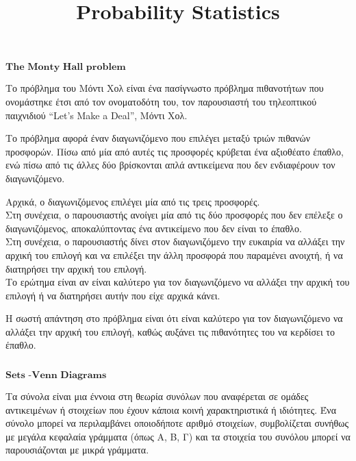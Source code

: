 \documentclass[11pt]{article}
\title{Probability Statistics}
\makeatletter
\newcommand{\boxspacing}{\kern\kvtcb@left@rule\kern\kvtcb@boxsep}
\newcommand{\prompt}[4]{
        {\ttfamily\llap{{\color{#2}[#3]:\hspace{3pt}#4}}\vspace{-\baselineskip}}
    }
\makeatother
\begin{document}
    
    \maketitle
    
    

    
    \(\textbf{The Monty Hall problem}\)

    Το πρόβλημα του Μόντι Χολ είναι ένα πασίγνωστο πρόβλημα πιθανοτήτων που
ονομάστηκε έτσι από τον ονοματοδότη του, τον παρουσιαστή του τηλεοπτικού
παιχνιδιού ``Let's Make a Deal'', Μόντι Χολ.

Το πρόβλημα αφορά έναν διαγωνιζόμενο που επιλέγει μεταξύ τριών πιθανών
προσφορών. Πίσω από μία από αυτές τις προσφορές κρύβεται ένα αξιοθέατο
έπαθλο, ενώ πίσω από τις άλλες δύο βρίσκονται απλά αντικείμενα που δεν
ενδιαφέρουν τον διαγωνιζόμενο.

Αρχικά, ο διαγωνιζόμενος επιλέγει μία από τις τρεις προσφορές.\\
Στη συνέχεια, ο παρουσιαστής ανοίγει μία από τις δύο προσφορές που δεν
επέλεξε ο διαγωνιζόμενος, αποκαλύπτοντας ένα αντικείμενο που δεν είναι
το έπαθλο.\\
Στη συνέχεια, ο παρουσιαστής δίνει στον διαγωνιζόμενο την ευκαιρία να
αλλάξει την αρχική του επιλογή και να επιλέξει την άλλη προσφορά που
παραμένει ανοιχτή, ή να διατηρήσει την αρχική του επιλογή.\\
Το ερώτημα είναι αν είναι καλύτερο για τον διαγωνιζόμενο να αλλάξει την
αρχική του επιλογή ή να διατηρήσει αυτήν που είχε αρχικά κάνει.

Η σωστή απάντηση στο πρόβλημα είναι ότι είναι καλύτερο για τον
διαγωνιζόμενο να αλλάξει την αρχική του επιλογή, καθώς αυξάνει τις
πιθανότητες του να κερδίσει το έπαθλο.

    \begin{tcolorbox}[breakable, size=fbox, boxrule=1pt, pad at break*=1mm,colback=cellbackground, colframe=cellborder]
\prompt{In}{incolor}{ }{\boxspacing}
\begin{Verbatim}[commandchars=\\\{\}]

\end{Verbatim}
\end{tcolorbox}

    \(\textbf{Sets -Venn Diagrams}\)

    Τα σύνολα είναι μια έννοια στη θεωρία συνόλων που αναφέρεται σε ομάδες
αντικειμένων ή στοιχείων που έχουν κάποια κοινή χαρακτηριστικά ή
ιδιότητες. Ένα σύνολο μπορεί να περιλαμβάνει οποιοδήποτε αριθμό
στοιχείων, συμβολίζεται συνήθως με μεγάλα κεφαλαία γράμματα (όπως Α, Β,
Γ) και τα στοιχεία του συνόλου μπορεί να παρουσιάζονται με μικρά
γράμματα.
\end{document}
